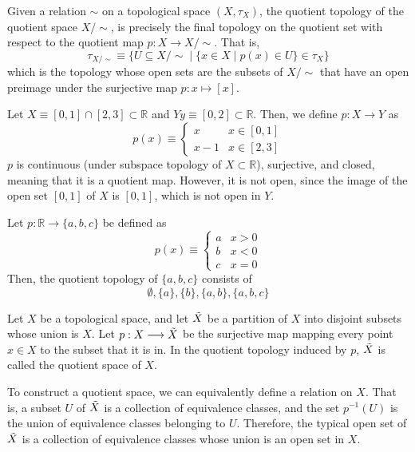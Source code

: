 \documentclass{article}
\begin{document}
    \begin{proposition}
    Given a relation $\sim$ on a topological space $(X, \tau_X)$, the quotient topology of the quotient space $X / \sim$, is precisely the final topology on the quotient set with respect to the quotient map $p: X \longrightarrow X / \sim$. That is, 
    \[\tau_{X / \sim} \equiv \big\{U \subseteq X / \sim \; | \; \{x \in X \; | \; p(x) \in U\} \in \tau_X \big\}\]
    which is the topology whose open sets are the subsets of $X / \sim$ that have an open preimage under the surjective map $p: x \mapsto [x]$. 
    \end{proposition}

    \begin{example}
    Let $X \equiv [0,1] \cap [2,3] \subset \mathbb{R}$ and $Y y \equiv [0,2] \subset \mathbb{R}$. Then, we define $p: X \longrightarrow Y$ as 
    \[p(x) \equiv \begin{cases}
          x & x \in [0,1] \\
          x-1 & x \in [2,3]
    \end{cases}\]
    $p$ is continuous (under subspace topology of $X \subset \mathbb{R}$), surjective, and closed, meaning that it is a quotient map. However, it is not open, since the image of the open set $[0,1]$ of $X$ is $[0,1]$, which is not open in $Y$. 
    \end{example}

    \begin{example}
    Let $p: \mathbb{R} \longrightarrow \{a, b, c\}$ be defined as 
    \[p(x) \equiv \begin{cases}
          a & x > 0 \\
          b & x < 0 \\
          c & x = 0
    \end{cases}\]
    Then, the quotient topology of $\{a, b, c\}$ consists of 
    \[\emptyset, \{a\}, \{b\}, \{a, b\}, \{a, b, c\}\]
    \end{example}

    \begin{definition}
    Let $X$ be a topological space, and let $\Tilde{X}$ be a partition of $X$ into disjoint subsets whose union is $X$. Let $p: X \longrightarrow \Tilde{X}$ be the surjective map mapping every point $x \in X$ to the subset that it is in. In the quotient topology induced by $p$, $\Tilde{X}$ is called the quotient space of $X$. 
    \end{definition}

    To construct a quotient space, we can equivalently define a relation on $X$. That is, a subset $U$ of $\Tilde{X}$ is a collection of equivalence classes, and the set $p^{-1}(U)$ is the union of equivalence classes belonging to $U$. Therefore, the typical open set of $\Tilde{X}$ is a collection of equivalence classes whose union is an open set in $X$. 
\end{document}
